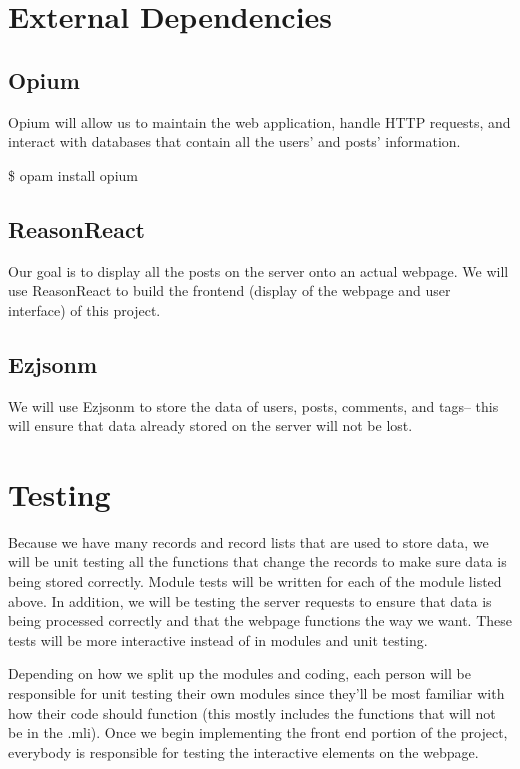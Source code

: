 \documentclass[11pt]{article}
\begin{document}
\section{External Dependencies}

\subsection{Opium}
Opium will allow us to maintain the web application, handle HTTP requests, and interact with databases that contain all the users’ and posts’ information. 

\$ opam install opium

\subsection{ReasonReact}
Our goal is to display all the posts on the server onto an actual webpage. We will use ReasonReact to build the frontend (display of the webpage and user interface) of this project.

\subsection{Ezjsonm}
We will use Ezjsonm to store the data of users, posts, comments, and tags-- this will ensure that data already stored on the server will not be lost. 

\section{Testing}

Because we have many records and record lists that are used to store data, we will be unit testing all the functions that change the records to make sure data is being stored correctly. Module tests will be written for each of the module listed above. In addition, we will be testing the server requests to ensure that data is being processed correctly and that the webpage functions the way we want. These tests will be more interactive instead of in modules and unit testing. 

Depending on how we split up the modules and coding, each person will be responsible for unit testing their own modules since they’ll be most familiar with how their code should function (this mostly includes the functions that will not be in the .mli). Once we begin implementing the front end portion of the project, everybody is responsible for testing the interactive elements on the webpage. 
\end{document}
